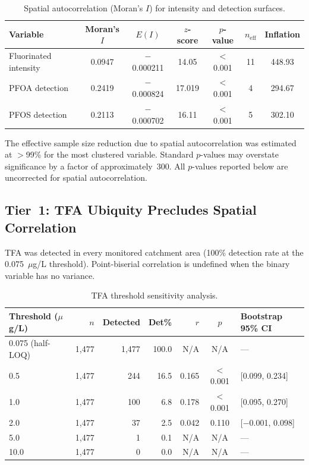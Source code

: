\documentclass[12pt,a4paper]{article}
\begin{document}
\begin{table}[H]
\centering
\caption{Spatial autocorrelation (Moran's $I$) for intensity and detection surfaces.}
\label{tab:moranI}
\footnotesize
\begin{tabular}{@{}lcccccc@{}}
\toprule
Variable & Moran's $I$ & $E(I)$ & $z$-score & $p$-value & $n_{\text{eff}}$ & Inflation \\
\midrule
Fluorinated intensity & 0.0947 & $-$0.000211 & 14.05 & $<$0.001 & 11 & 448.93 \\
PFOA detection & 0.2419 & $-$0.000824 & 17.019 & $<$0.001 & 4 & 294.67 \\
PFOS detection & 0.2113 & $-$0.000702 & 16.11 & $<$0.001 & 5 & 302.10 \\
\bottomrule
\end{tabular}
\end{table}

\noindent The effective sample size reduction due to spatial autocorrelation was estimated at $>$99\% for the most clustered variable. Standard $p$-values may overstate significance by a factor of approximately~300. All $p$-values reported below are uncorrected for spatial autocorrelation.

\subsection{Tier~1: TFA Ubiquity Precludes Spatial Correlation}

TFA was detected in every monitored catchment area (100\% detection rate at the 0.075~$\mu$g/L threshold). Point-biserial correlation is undefined when the binary variable has no variance.

\begin{table}[H]
\centering
\caption{TFA threshold sensitivity analysis.}
\label{tab:tfa}
\begin{tabular}{@{}lrrrrcl@{}}
\toprule
Threshold ($\mu$g/L) & $n$ & Detected & Det\% & $r$ & $p$ & Bootstrap 95\% CI \\
\midrule
0.075 (half-LOQ) & 1,477 & 1,477 & 100.0 & N/A & N/A & --- \\
0.5 & 1,477 & 244 & 16.5 & 0.165 & $<$0.001 & [0.099, 0.234] \\
1.0 & 1,477 & 100 & 6.8 & 0.178 & $<$0.001 & [0.095, 0.270] \\
2.0 & 1,477 & 37 & 2.5 & 0.042 & 0.110 & [$-$0.001, 0.098] \\
5.0 & 1,477 & 1 & 0.1 & N/A & N/A & --- \\
10.0 & 1,477 & 0 & 0.0 & N/A & N/A & --- \\
\bottomrule
\end{tabular}
\end{table}
\end{document}

